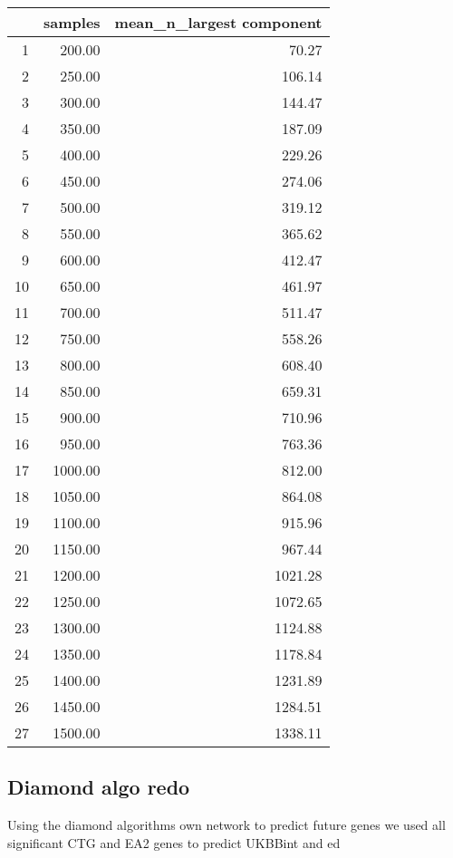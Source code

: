 \begin{table}[ht]
\centering
\begin{tabular}{rrr}
  \hline
 & samples & mean\_n\_largest component \\ 
  \hline
1 & 200.00 & 70.27 \\ 
  2 & 250.00 & 106.14 \\ 
  3 & 300.00 & 144.47 \\ 
  4 & 350.00 & 187.09 \\ 
  5 & 400.00 & 229.26 \\ 
  6 & 450.00 & 274.06 \\ 
  7 & 500.00 & 319.12 \\ 
  8 & 550.00 & 365.62 \\ 
  9 & 600.00 & 412.47 \\ 
  10 & 650.00 & 461.97 \\ 
  11 & 700.00 & 511.47 \\ 
  12 & 750.00 & 558.26 \\ 
  13 & 800.00 & 608.40 \\ 
  14 & 850.00 & 659.31 \\ 
  15 & 900.00 & 710.96 \\ 
  16 & 950.00 & 763.36 \\ 
  17 & 1000.00 & 812.00 \\ 
  18 & 1050.00 & 864.08 \\ 
  19 & 1100.00 & 915.96 \\ 
  20 & 1150.00 & 967.44 \\ 
  21 & 1200.00 & 1021.28 \\ 
  22 & 1250.00 & 1072.65 \\ 
  23 & 1300.00 & 1124.88 \\ 
  24 & 1350.00 & 1178.84 \\ 
  25 & 1400.00 & 1231.89 \\ 
  26 & 1450.00 & 1284.51 \\ 
  27 & 1500.00 & 1338.11 \\ 
   \hline
\end{tabular}
\end{table}

\subsection{Diamond algo redo}

Using the diamond algorithms own network to predict future genes we used all significant CTG and EA2 genes to predict UKBBint and ed

